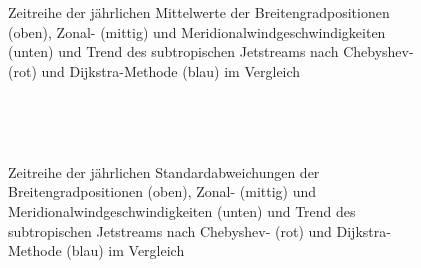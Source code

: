 \begin{figure} %
  \centering
  \begin{minipage}{\textwidth}
    \centering
  \end{minipage} \\ 
    \begin{minipage}{\textwidth}
      \centering
  \end{minipage} \\ 
  \begin{minipage}{\textwidth}
    \centering
  \end{minipage}
  \caption[Zeitreihe der Mittelwerte der Positionen, des Zonal- und Meridionalwinds des Subtropenjets nach Chebyshev und Dijkstra]{Zeitreihe der jährlichen Mittelwerte der Breitengradpositionen (oben), Zonal- (mittig) und Meridionalwindgeschwindigkeiten (unten) und Trend des subtropischen Jetstreams nach Chebyshev- (rot) und Dijkstra-Methode (blau) im Vergleich} \label{fig:stj-mean}
\end{figure}

\begin{figure} %
  \centering
  \begin{minipage}{\textwidth}
    \centering
  \end{minipage} \\ 
    \begin{minipage}{\textwidth}
      \centering
  \end{minipage} \\ 
  \begin{minipage}{\textwidth}
    \centering
  \end{minipage}
  \caption[Zeitreihe der Standardabweichungen der Positionen, des Zonal- und Meridionalwinds des Subtropenjets nach Chebyshev und Dijkstra]{Zeitreihe der jährlichen Standardabweichungen der Breitengradpositionen (oben), Zonal- (mittig) und Meridionalwindgeschwindigkeiten (unten) und Trend des subtropischen Jetstreams nach Chebyshev- (rot) und Dijkstra-Methode (blau) im Vergleich} \label{fig:stj-sd}
\end{figure}

